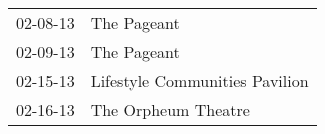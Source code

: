 \begin{supertabular}{p{0.07\textwidth}p{0.23\textwidth}}
 02-08-13 &                     The Pageant \\
 02-09-13 &                     The Pageant \\
 02-15-13 &  Lifestyle Communities Pavilion \\
 02-16-13 &             The Orpheum Theatre \\
\end{supertabular}

